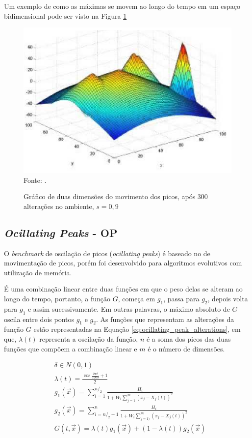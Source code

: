 Um exemplo de como as máximas se movem ao longo do tempo em um espaço bidimensional pode ser visto na Figura \ref{fig:moving_peaks}

\begin{figure}[!htb]
	\caption{Gráfico de duas dimensões do movimento dos picos, após 300 alterações no ambiente, $ s = 0,9 $}
	\centering
	\includegraphics[scale=0.5]{images/moving_peak.png}
	\label{fig:moving_peaks}{\\Fonte: .}
\end{figure}

\subsection{\textit{Ocillating Peaks} - OP}
\label{sec:ocillating_peaks}

O \textit{benchmark} de oscilação de picos (\textit{ocillating peaks}) é baseado no de movimentação de picos, porém foi desenvolvido para algoritmos evolutivos com utilização de memória.

É uma combinação linear entre duas funções em que o peso delas se alteram ao longo do tempo, portanto, a função $G$, começa em $g_1$, passa para $g_2$, depois volta para $g_1$ e assim sucessivamente. Em outras palavras, o máximo absoluto de $G$ oscila entre dois pontos $g_1$ e $g_2$. As funções que representam as alterações da função $G$ estão representadas na Equação \ref{eq:ocillating_peak_alterations}, em que, $\lambda (t)$ representa a oscilação da função, $n$ é a soma dos picos das duas funções que compõem a combinação linear e $m$ é o número de dimensões.

\begin{equation}
\label{eq:ocillating_peak_alterations}
\begin{split}
& \delta \in N(0,1) \\
& \lambda (t) = \frac{\cos{\frac{2\pi t}{100\delta}} +1}{2} \\
& g_1(\vec{x}) = \sum_{i=1}^{n/_2} \frac{H_i}{1+W_i \sum_{j=1}^{m} (x_j - X_j(t))^2} \\
& g_2(\vec{x}) = \sum_{i=n/_2+1}^{n} \frac{H_i}{1+W_i \sum_{j=1)}^{m} (x_j - X_j(t))^2} \\
& G(t,\vec{x}) = \lambda (t) g_1(\vec{x}) + (1-\lambda (t))g_2(\vec{x})
\end{split}
\end{equation}

